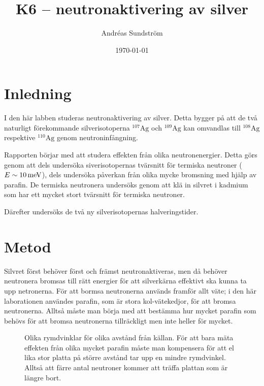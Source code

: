 \documentclass[11pt,a4paper, english, swedish
]{article}
\begin{document}

\title{K6 -- neutronaktivering av silver}
\author{Andréas Sundström}
\date{\today}

\maketitle



\section{Inledning}
I den här labben studeras neutronaktivering av silver. Detta bygger på att de två naturligt förekommande silverisotoperna $^{107}\text{Ag}$ och $^{109}\text{Ag}$ kan omvandlas till $^{108}\text{Ag}$ respektive $^{110}\text{Ag}$ genom neutroninfångning.

Rapporten börjar med att studera effekten från olika neutronenergier. Detta görs genom att dels undersöka siverisotopernas tvärsnitt för termiska neutroner ($E\sim \unit[10]{meV}$), dels undersöka påverkan från olika mycke bromsning med hjälp av parafin. De termiska neutronera undersöks genom att klä in silvret i kadmium som har ett mycket stort tvärsnitt för termiska neutroner. 

Därefter undersöks de två ny silverisotopernas halveringstider. 

\section{Metod}
Silvret först behöver först och främst neutronaktiveras, men då
behöver neutronera bromsas till rätt energier för att silverkärna
effektivt ska kunna ta upp netronerna. För att bormsa neutronerna
används framför allt väte; i den här laborationen användes parafin,
som är stora kol-vätekedjor, för att bromsa neutronerna. Alltså måste
man börja med att bestämma hur mycket parafin som behövs för att
bromsa neutronerna tillräckligt men inte heller för mycket.


\begin{figure}\centering
\resizebox{.5\textwidth}{!}{}
\caption{Olika rymdvinklar för olika avstånd från källan. För att bara mäta effekten från olika mycket parafin måste man kompensera för att el lika stor platta på större avstånd tar upp en mindre rymdvinkel. Alltså att färre antal neutroner kommer att träffa plattan som är längre bort.}
\label{fig:aktivering}
\end{figure}
\end{document}
